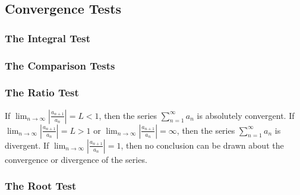 \subsection{Convergence Tests}
\subsubsection*{The Integral Test}
\subsubsection*{The Comparison Tests}
\subsubsection*{The Ratio Test}
\begin{theorem}
    If
    \(\displaystyle{\lim_{n\to\infty}\left|\frac{a_{n+1}}{a_n}\right|=L<1}\),
    then the series \(\sum_{n=1}^\infty a_n\) is absolutely convergent.
    If
    \(\displaystyle{\lim_{n\to\infty}\left|\frac{a_{n+1}}{a_n}\right|=L>1}\)
    or
    \(\displaystyle{\lim_{n\to\infty}\left|\frac{a_{n+1}}{a_n}\right|
    =\infty}\),
    then the series \(\sum_{n=1}^\infty a_n\) is divergent.
    If
    \(\displaystyle{\lim_{n\to\infty}\left|\frac{a_{n+1}}{a_n}\right|=1}\),
    then no conclusion can be drawn about the convergence or divergence of the
    series.
\end{theorem}
\subsubsection*{The Root Test}